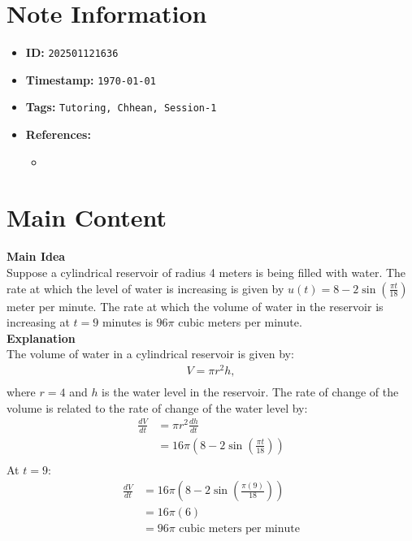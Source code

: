 \clearpage
{}
\label{202501121636}
\renewcommand{\notetitle}{Question-4}

\section*{Note Information}
\begin{itemize}
  \item \textbf{ID:} \texttt{202501121636}
  \item \textbf{Timestamp:} \texttt{\today \ \currenttime}
  \item \textbf{Tags:} \texttt{Tutoring, Chhean, Session-1}
  \item \textbf{References:}
    \begin{itemize}
      \item \href{}{}
    \end{itemize}
\end{itemize}


\section*{Main Content}
\textbf{Main Idea}\\
Suppose a cylindrical reservoir of radius 4 meters is being filled with water. The rate at which the level of water is increasing is given by $u(t) = 8 - 2 \sin (\frac{\pi t}{18})$ meter per minute.
The rate at which the volume of water in the reservoir is increasing at $t = 9$ minutes is $96 \pi$ cubic meters per minute.\\

\textbf{Explanation}\\
The volume of water in a cylindrical reservoir is given by:
\begin{align*}
  V = \pi r^2 h,\\
\end{align*}
where $r = 4$ and $h$ is the water level in the reservoir. 
The rate of change of the volume is related to the rate of change of the water level by:
\begin{align*}
  \frac{dV}{dt} &= \pi r^2 \frac{dh}{dt}\\
  &= 16 \pi (8 - 2 \sin(\frac{\pi t}{18}))\\
\end{align*}
At $t = 9$:
\begin{align*}
  \frac{dV}{dt} &= 16 \pi (8 - 2 \sin (\frac{\pi (9)}{18}))\\
                &= 16 \pi (6)\\
                &= 96 \pi \text{ cubic meters per minute}
\end{align*}

